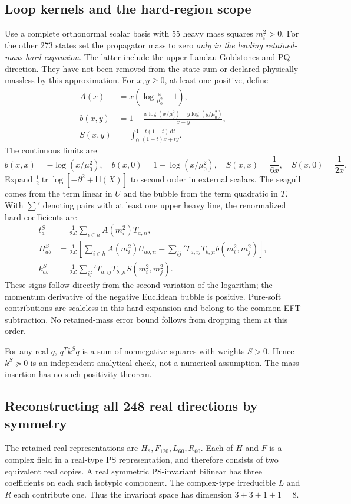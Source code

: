 \documentclass[11pt]{article}
\newcommand{\tr}{\operatorname{tr}}
\newcommand{\dd}{\mathrm d}
\newcommand{\LOOP}{\mathcal L}
\begin{document}
\subsection{Loop kernels and the hard-region scope}
Use a complete orthonormal scalar basis with 55 heavy mass squares $m_i^2>0$.
For the other 273 states set the propagator mass to zero \emph{only in the
leading retained-mass hard expansion}. The latter include the upper
Landau Goldstones and PQ direction. They have not been removed from the
state sum or declared physically massless by this approximation.
For $x,y\geq0$, at least one positive, define
\begin{align}
 A(x)&=x\left(\log\frac{x}{\mu_0^2}-1\right),\\
 b(x,y)&=1-\frac{x\log(x/\mu_0^2)-y\log(y/\mu_0^2)}{x-y},\\
 S(x,y)&=\int_0^1\frac{t(1-t)\,\dd t}{(1-t)x+ty}.
 \label{eq:scalar-kernels}
\end{align}
The continuous limits are
\begin{equation}
 b(x,x)=-\log(x/\mu_0^2),\quad b(x,0)=1-\log(x/\mu_0^2),
 \quad S(x,x)=\frac1{6x},\quad S(x,0)=\frac1{2x}.
\end{equation}
Expand $\tfrac12\tr\log[-\partial^2+\mathsf H(X)]$ to second order in
external scalars. The seagull comes from the term linear in $U$ and the
bubble from the term quadratic in $T$. With $\sum'$ denoting pairs with
at least one upper heavy line, the renormalized hard coefficients are
\begin{align}
 t_a^{S}&=\frac1{2\LOOP}\sum_{i\in h} A(m_i^2)T_{a,ii},\\
 \Pi_{ab}^{S}&=\frac1{2\LOOP}\left[
   \sum_{i\in h}A(m_i^2)U_{ab,ii}
   -\sum_{ij}'T_{a,ij}T_{b,ji}b(m_i^2,m_j^2)\right],\\
 k_{ab}^{S}&=\frac1{2\LOOP}\sum_{ij}'
 T_{a,ij}T_{b,ji}S(m_i^2,m_j^2).
 \label{eq:scalar-two-point}
\end{align}
These signs follow directly from the second variation of the logarithm;
the momentum derivative of the negative Euclidean bubble is positive.
Pure-soft contributions are scaleless in this hard expansion and belong
to the common EFT subtraction. No retained-mass error bound follows from
dropping them at this order.

For any real $q$, $q^Tk^Sq$ is a sum of nonnegative squares with weights
$S>0$. Hence $k^S\succeq0$ is an independent analytical check, not a
numerical assumption. The mass insertion has no such positivity theorem.

\subsection{Reconstructing all 248 real directions by symmetry}
The retained real representations are $H_8,F_{120},L_{60},R_{60}$.
Each of $H$ and $F$ is a complex field in a real-type PS representation,
and therefore consists of two equivalent real copies. A real symmetric
PS-invariant bilinear has three coefficients on each such isotypic
component. The complex-type irreducible $L$ and $R$ each contribute one.
Thus the invariant space has dimension $3+3+1+1=8$.
\end{document}
